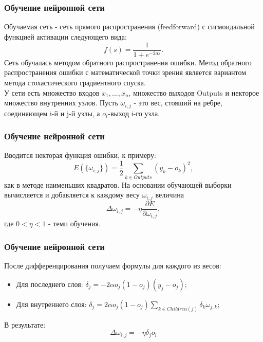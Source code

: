 \documentclass{beamer}
\begin{document}
\section{}
\begin{frame}
\frametitle{Обучение нейронной сети}
	Обучаемая сеть - сеть прямого распространения (feedforward) с сигмоидальной функцией активации следующего вида: $$f(s)=\frac{1}{1+e^{-2as}}.$$ Сеть обучалась методом обратного распространения ошибки. Метод обратного распространения ошибки с математической точки зрения является вариантом метода стохастического градиентного спуска.\newline
	\\
	У сети есть множество входов $x_1,...,x_n$, множество выходов Outputs и некторое множество внутренних узлов. Пусть $\omega_{i,j}$ - это вес, стояший на ребре, соединяющем i-й и j-й узлы, а $o_i$-выход i-го узла.
\end{frame}

\begin{frame}
\frametitle{Обучение нейронной сети}
Вводится некторая функция ошибки, к примеру: $$E(\{\omega_{i,j}\})=\frac{1}{2}\sum\limits_{k\in Outputs}(y_k-o_k)^2,$$ как в методе наименьших квадратов.
На основании обучающей выборки вычисляется и добавляется к каждому весу $\omega_{i,j}$ величина $$\Delta\omega_{i,j}=-\eta\frac{\partial E}{\partial \omega_{i,j}},$$ где $0<\eta<1$ - темп обучения.
\end{frame}
\begin{frame}
\frametitle{Обучение нейронной сети}
После дифференцирования получаем формулы для каждого из весов:
\begin{itemize}
	\item{Для последнего слоя: $\delta_j=-2\alpha o_j(1-o_j)(y_j-o_j);$}
	\item{Для внутреннего слоя: $\delta_j=2\alpha o_j(1-o_j)\sum\limits_{k\in Children(j)}\delta_k\omega_{j,k};$}
\end{itemize}
В результате: $$\Delta\omega_{i,j}=-\eta\delta_j o_i$$

\end{frame}
\end{document}
